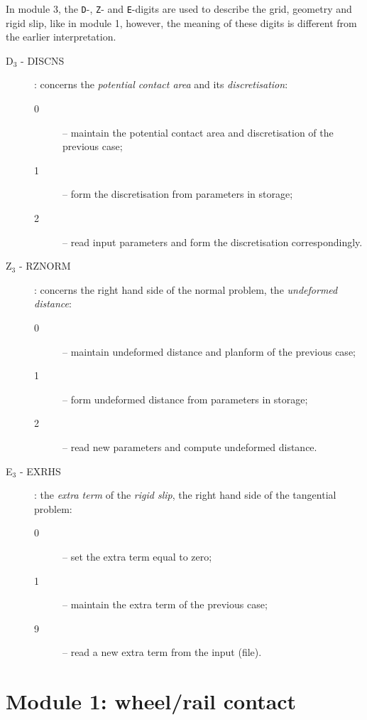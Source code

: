 \documentclass[12pt]{report}
\begin{document}
In module 3, the {\tt D}-, {\tt Z}- and {\tt E}-digits are used to
describe the grid, geometry and rigid slip, like in module 1,
however, the meaning of these digits is different from the earlier
interpretation. 
\begin{description}
\item[D$_3$ - DISCNS] \label{d3-digit} : concerns the {\em potential contact
        area\/} and its {\em discretisation\/}:
\begin{description}
\item[0] -- maintain the potential contact area and discretisation of the
        previous case;
\item[1] -- form the discretisation from parameters in storage;
\item[2] -- read input parameters and form the discretisation correspondingly.
\end{description}

\item[Z$_3$ - RZNORM] \label{z3-digit} : concerns the right hand side of the
        normal problem, the {\em undeformed distance\/}:
\begin{description}
\item[0] -- maintain undeformed distance and planform of the previous case;
\item[1] -- form undeformed distance from parameters in storage;
\item[2] -- read new parameters and compute undeformed distance.
\end{description}

\item[E$_3$ - EXRHS] \label{e3-digit} : the {\em extra term\/} of the {\em
        rigid slip\/}, the right hand side of the tangential problem:
\begin{description}
\item[0] -- set the extra term equal to zero;
\item[1] -- maintain the extra term of the previous case;
\item[9] -- read a new extra term from the input (file).
\end{description}

\end{description}


\chapter{Module 1: wheel/rail contact}
\label{chp:module1}
\end{document}
